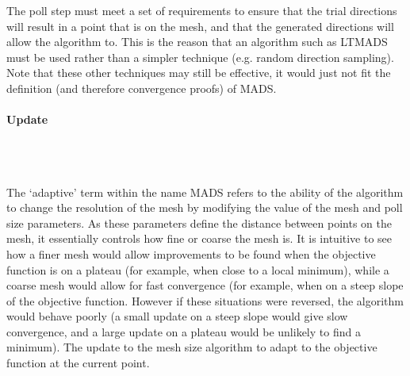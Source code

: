 The poll step must meet a set of requirements to ensure that the trial directions will result in a point that is on the mesh, and that the generated directions will allow the algorithm to. This is the reason that an algorithm such as \ac{LTMADS} must be used rather than a simpler technique (e.g. random direction sampling). Note that these other techniques may still be effective, it would just not fit the definition (and therefore convergence proofs) of \ac{MADS}.

\paragraph{Update} \\\

The `adaptive' term within the name \ac{MADS} refers to the ability of the algorithm to change the resolution of the mesh by modifying the value of the mesh and poll size parameters. As these parameters define the distance between points on the mesh, it essentially controls how fine or coarse the mesh is. It is intuitive to see how a finer mesh would allow improvements to be found when the objective function is on a plateau (for example, when close to a local minimum), while a coarse mesh would allow for fast convergence (for example, when on a steep slope of the objective function. However if these situations were reversed, the algorithm would behave poorly (a small update on a steep slope would give slow convergence, and a large update on a plateau would be unlikely to find a minimum). The update to the mesh size algorithm to adapt to the objective function at the current point.

